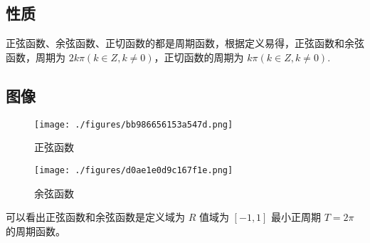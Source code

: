 \subsection{性质}

正弦函数、余弦函数、正切函数的都是周期函数，根据定义易得，正弦函数和余弦函数，周期为 $2k\pi(k\in Z,k\neq0)$，正切函数的周期为 $k\pi(k\in Z,k\neq0)$.

\subsection{图像}

\begin{figure}[ht]
\centering
\texttt{[image: ./figures/bb986656153a547d.png]}
\caption{正弦函数} \label{fig_HsTrFu_1}
\end{figure}
\begin{figure}[ht]
\centering
\texttt{[image: ./figures/d0ae1e0d9c167f1e.png]}
\caption{余弦函数} \label{fig_HsTrFu_2}
\end{figure}
可以看出正弦函数和余弦函数是定义域为 $R$ 值域为 $[-1,1]$ 最小正周期 $T = 2\pi$ 的周期函数。

